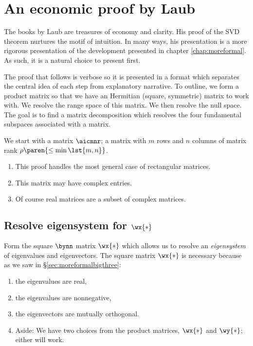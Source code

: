 \section{An economic proof by Laub}

The books by Laub are treasures of economy and clarity. His proof \cite[p. 35]{Laub2005} of the SVD theorem nurtures the motif of intuition. In many ways, his presentation is a more rigorous presentation of the development presented in chapter \eqref{chap:moreformal}. As such, it is a natural choice to present first.

The proof that follows is verbose so it is presented in a format which separates the central idea of each step from explanatory narrative. To outline, we form a product matrix so that we have an Hermitian (square, symmetric) matrix to work with. We resolve the range space of this matrix. We then resolve the null space. The goal is to find a matrix decomposition which resolves the four fundamental subspaces associated with a matrix.

We start with a matrix $\aicmnr$; a matrix with $m$ rows and $n$ columns of matrix rank $\rho\paren{\le \min\lst{m,n}}$. 
\begin{enumerate}
\item This proof handles the most general case of rectangular matrices. 
\item This matrix may have complex entries. 
\item Of course real matrices are a subset of complex matrices.
\end{enumerate}
\subsection{Resolve eigensystem for $\wx{*}$} Form the square $\bynn$ matrix $\wx{*}$ which allows us to resolve an \emph{eigensystem} of eigenvalues and eigenvectors. The square matrix $\wx{*}$ is necessary because as we saw in \S\eqref{sec:moreformalbigthree}:
\begin{enumerate}
%
\item the eigenvalues are real,
\item the eigenvalues are nonnegative,
\item the eigenvectors are mutually orthogonal.
\item Aside: We have two choices from the product matrices, $\wx{*}$ and $\wy{*}$; either will work.
%
\end{enumerate}
